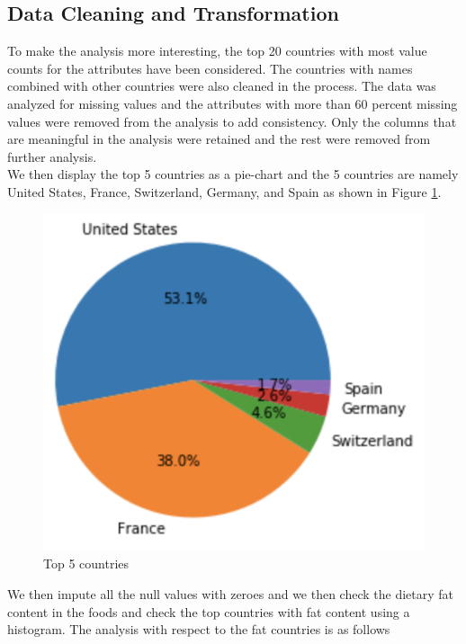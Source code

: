 \documentclass[sigconf]{acmart}
\begin{document}
\subsection{Data Cleaning and Transformation}
To make the analysis more interesting, the top 20 countries with most value counts for the attributes have been considered. The countries with names combined with other countries were also cleaned in the process. The data was analyzed for missing values and the attributes with more than 60 percent missing values were removed from the analysis to add consistency. Only the columns that are meaningful in the analysis were retained and the rest were removed from further analysis. \\

We then display the top 5 countries as a pie-chart and the 5 countries are namely United States, France, Switzerland, Germany, and Spain as shown in Figure \ref{fig:Fig7}. 

\begin{figure}
\includegraphics[width=1.0\columnwidth]{images/fig7.png}
\caption{Top 5 countries \cite{code-base}}
\label{fig:Fig7}
\end{figure}

We then impute all the null values with zeroes and we then check the dietary fat content in the foods and check the top countries with fat content using a histogram. The analysis with respect to the fat countries is as follows \\
\end{document}
